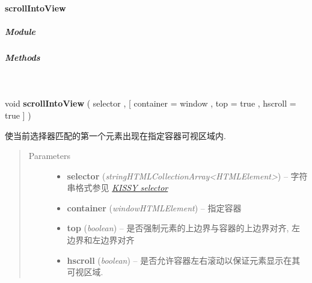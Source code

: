 \documentclass[letterpaper,10pt,english]{sphinxmanual}
\begin{document}
\paragraph{scrollIntoView}
\label{api/core/dom/scrollIntoView:scrollintoview}\label{api/core/dom/scrollIntoView::doc}

\subparagraph{Module}
\label{api/core/dom/scrollIntoView:module}\begin{quote}

{\hyperref[api/core/dom/index:module-DOM]{}}
\end{quote}


\subparagraph{Methods}
\label{api/core/dom/scrollIntoView:methods}

\begin{fulllineitems}
\label{api/core/dom/scrollIntoView:DOM.scrollIntoView}~
\begin{DUlineblock}{0em}
\item[] void \textbf{scrollIntoView} ( selector , {[} container = window , top = true , hscroll = true {]} )
\item[] 使当前选择器匹配的第一个元素出现在指定容器可视区域内.
\end{DUlineblock}
\begin{quote}\begin{description}
\item[{Parameters}] \leavevmode\begin{itemize}
\item {}
\textbf{selector} (\emph{string\textbar{}HTMLCollection\textbar{}Array\textless{}HTMLElement\textgreater{}}) -- 字符串格式参见 {\hyperref[api/core/dom/selector:dom-selector]{\emph{KISSY selector}}}

\item {}
\textbf{container} (\emph{window\textbar{}HTMLElement}) -- 指定容器

\item {}
\textbf{top} (\emph{boolean}) -- 是否强制元素的上边界与容器的上边界对齐, 左边界和左边界对齐

\item {}
\textbf{hscroll} (\emph{boolean}) -- 是否允许容器左右滚动以保证元素显示在其可视区域.

\end{itemize}

\end{description}\end{quote}

\end{fulllineitems}
\end{document}
